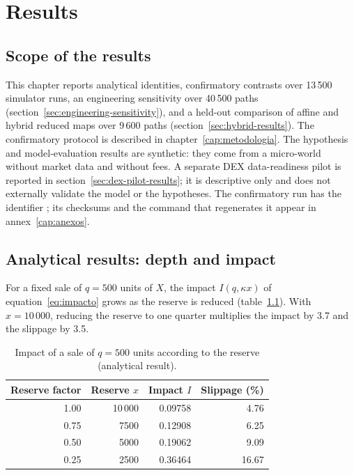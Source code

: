 \chapter{Results}
\label{cap:resultados}

\section{Scope of the results}

This chapter reports analytical identities, confirmatory contrasts over 13\,500 simulator runs, an engineering sensitivity over 40\,500 paths (section~\ref{sec:engineering-sensitivity}), and a held-out comparison of affine and hybrid reduced maps over 9\,600 paths (section~\ref{sec:hybrid-results}). The confirmatory protocol is described in chapter~\ref{cap:metodologia}. The hypothesis and model-evaluation results are synthetic: they come from a micro-world without market data and without fees. A separate DEX data-readiness pilot is reported in section~\ref{sec:dex-pilot-results}; it is descriptive only and does not externally validate the model or the hypotheses. The confirmatory run has the identifier \code{\RunID}; its checksums and the command that regenerates it appear in annex~\ref{cap:anexos}.

\section{Analytical results: depth and impact}
\label{sec:res-analitico}

For a fixed sale of $q=500$ units of $X$, the impact $I(q,\kappa x)$ of equation~\eqref{eq:impacto} grows as the reserve is reduced (table~\ref{tab:impacto}). With $x=10\,000$, reducing the reserve to one quarter multiplies the impact by 3.7 and the slippage by 3.5.

\begin{table}[htbp]
\centering
\caption{Impact of a sale of $q=500$ units according to the reserve (analytical result).}
\label{tab:impacto}
\small
\begin{tabular}{@{}rrrr@{}}
\toprule
Reserve factor & Reserve $x$ & Impact $I$ & Slippage (\%) \\
\midrule
1.00 & 10\,000 & 0.09758 & 4.76 \\
0.75 & 7500 & 0.12908 & 6.25 \\
0.50 & 5000 & 0.19062 & 9.09 \\
0.25 & 2500 & 0.36464 & 16.67 \\
\bottomrule
\end{tabular}
\end{table}

